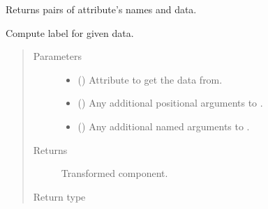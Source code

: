 \documentclass[letterpaper,10pt,english]{sphinxmanual}
\begin{document}
\begin{fulllineitems}
\begin{fulllineitems}
\end{fulllineitems}


\begin{fulllineitems}
\label{\detokenize{api/states:geology.src.States.items}}
Returns pairs of attribute’s names and data.

\end{fulllineitems}


\begin{fulllineitems}
\label{\detokenize{api/states:geology.src.States.label}}
Compute label for given data.
\begin{quote}\begin{description}
\item[{Parameters}] \leavevmode\begin{itemize}
\item {} 
 (\sphinxstyleliteralemphasis{\sphinxupquote{, }}) \textendash{} Attribute to get the data from.

\item {} 
 () \textendash{} Any additional positional arguments to .

\item {} 
 () \textendash{} Any additional named arguments to .

\end{itemize}

\item[{Returns}] \leavevmode
{} \textendash{} Transformed component.

\item[{Return type}] \leavevmode
{\hyperref[\detokenize{api/base_classes:geology.src.base_spatial.SpatialComponent}]{}}


\end{description}
\end{quote}
\end{fulllineitems}
\end{fulllineitems}
\end{document}

